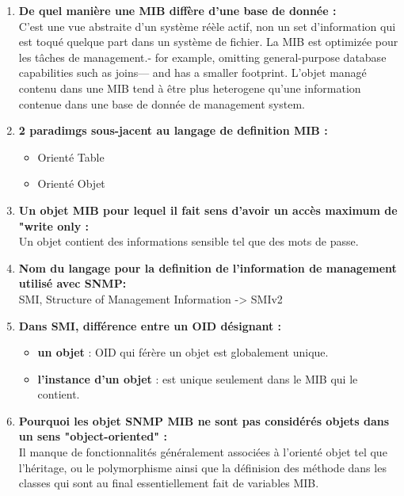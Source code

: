 \documentclass[12pt,landscape]{article}
\begin{document}
\begin{multicols}{2}
\begin{enumerate}
\item \textbf{De quel manière une MIB diffère d'une base de donnée :}\\
C'est une vue abstraite d'un système réèle actif, non un set d'information qui est toqué quelque part dans un système de fichier. La MIB est optimizée pour les tâches de management.- for example, omitting general-purpose database capabilities such as joins—
and has a smaller footprint. L'objet managé contenu dans une MIB tend à être plus heterogene qu'une information contenue dans une base de donnée de management system.

\item \textbf{2 paradimgs sous-jacent au langage de definition MIB : }\\
\begin{itemize}
\item Orienté Table
\item Orienté Objet
\end{itemize}

\item \textbf{Un objet MIB pour lequel il fait sens d'avoir un accès  maximum de "write only :}\\
Un objet contient des informations sensible tel que des mots de passe.

\item \textbf{Nom du langage pour la definition de l'information de management utilisé avec SNMP:}\\
SMI, Structure of Management Information -> SMIv2

\item \textbf{Dans SMI, différence entre un OID désignant :}\\
\begin{itemize}
\item \textbf{un objet} : OID qui férère un objet est globalement unique.
\item \textbf{l'instance d'un objet} : est unique seulement dans le MIB qui le contient.
\end{itemize}

\item \textbf{Pourquoi les objet SNMP MIB ne sont pas considérés objets dans un sens "object-oriented" :}\\
Il manque de fonctionnalités généralement associées à l'orienté objet tel que l'héritage, ou le polymorphisme ainsi que la définision des méthode dans les classes qui sont au final essentiellement fait de variables MIB.



\end{enumerate}
\end{multicols}
\end{document}
